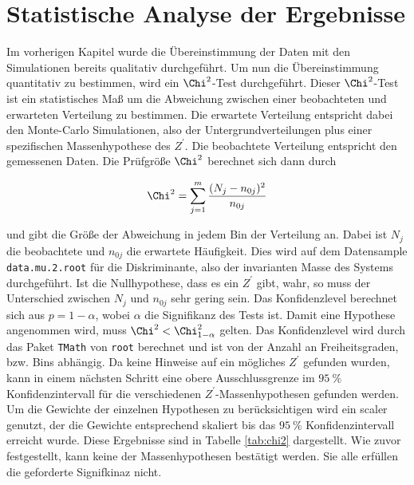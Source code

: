 \section{Statistische Analyse der Ergebnisse}
\label{sec:chi}

Im vorherigen Kapitel wurde die Übereinstimmung der Daten mit den Simulationen bereits qualitativ durchgeführt.
Um nun die Übereinstimmung quantitativ zu bestimmen, wird ein $\Chi^2$-Test durchgeführt.
Dieser $\Chi^2$-Test ist ein statistisches Maß um die Abweichung zwischen einer beobachteten und erwarteten Verteilung zu bestimmen.
Die erwartete Verteilung entspricht dabei den Monte-Carlo Simulationen, also der Untergrundverteilungen plus einer spezifischen Massenhypothese des $Z^\prime$.
Die beobachtete Verteilung entspricht den gemessenen Daten.
Die Prüfgröße $\Chi^2$ berechnet sich dann durch

\begin{equation}
  \Chi^2 = \sum_{j=1}^m \frac{(N_j - n_{0j})^2}{n_{0j}}
\end{equation}

und gibt die Größe der Abweichung in jedem Bin der Verteilung an.
Dabei ist $N_j$ die beobachtete und $n_{0j}$ die erwartete Häufigkeit.
Dies wird auf dem Datensample \texttt{data.mu.2.root} für die Diskriminante, also der invarianten Masse des Systems durchgeführt.
Ist die Nullhypothese, dass es ein $Z^\prime$ gibt, wahr, so muss der Unterschied zwischen $N_j$ und $n_{0j}$ sehr gering sein.
Das Konfidenzlevel berechnet sich aus $p = 1 - \alpha$, wobei $\alpha$ die Signifikanz des Tests ist.
Damit eine Hypothese angenommen wird, muss $\Chi^2 < \Chi^2_{1-\alpha}$ gelten.
Das Konfidenzlevel wird durch das Paket \texttt{TMath} von \texttt{root} berechnet und ist von der Anzahl an Freiheitsgraden, bzw. Bins abhängig.
Da keine Hinweise auf ein mögliches $Z^\prime$ gefunden wurden, kann in einem nächsten Schritt eine obere Ausschlussgrenze im $\SI{95}{\percent}$ Konfidenzintervall für die verschiedenen $Z^\prime$-Massenhypothesen gefunden werden.
Um die Gewichte der einzelnen Hypothesen zu berücksichtigen wird ein scaler genutzt, der die Gewichte entsprechend skaliert bis das $\SI{95}{\percent}$ Konfidenzintervall erreicht wurde.
Diese Ergebnisse sind in Tabelle \ref{tab:chi2} dargestellt.
Wie zuvor festgestellt, kann keine der Massenhypothesen bestätigt werden.
Sie alle erfüllen die geforderte Signifkinaz nicht.

